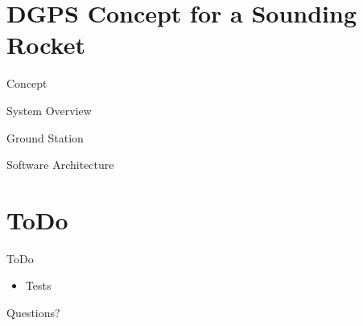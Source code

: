 \documentclass[12pt, compress, xcolor=table]{beamer}
\begin{document}
\section{DGPS Concept for a Sounding Rocket}

\begin{frame}{Concept}
 
\end{frame}

\begin{frame}{System Overview}
 
\end{frame}

\begin{frame}{Ground Station}
 
\end{frame}

\begin{frame}{Software Architecture}
 
\end{frame}


\section{ToDo}

\begin{frame}{ToDo}
 \begin{itemize}
  \setlength\itemsep{0.5cm}
  \item Tests
 \end{itemize}
\end{frame}


\begin{frame}[standout]
 Questions?
\end{frame}
\end{document}
